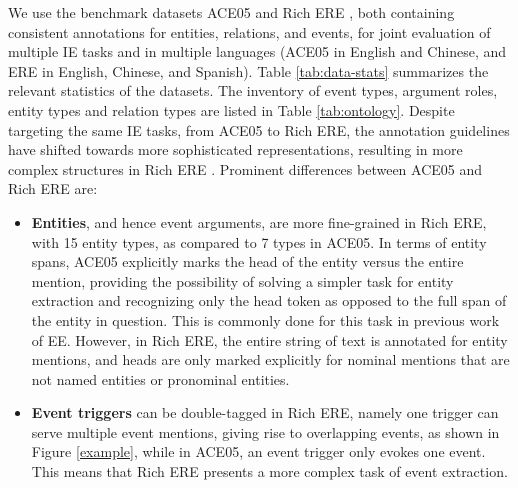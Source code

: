 \documentclass[11pt]{article}
\begin{document}
\begin{table}[t]%
\footnotesize
{}
\caption{\footnotesize Inventory of event types, argument roles, entity types and relation types in ACE05 and Rich ERE.}
\label{tab:ontology}
\end{table}


We use the benchmark datasets ACE05 \cite{doddington-etal-2004-automatic} and Rich ERE \cite{song-etal-2015-light}, both containing consistent annotations for entities, relations, and events, for joint evaluation of multiple IE tasks and in multiple languages (ACE05 in English and Chinese, and ERE in English, Chinese, and Spanish). Table \ref{tab:data-stats} summarizes the relevant statistics of the  datasets. The inventory of event types, argument roles, entity types and relation types are listed in Table \ref{tab:ontology}. Despite targeting the same IE tasks, from ACE05 to Rich ERE, the annotation guidelines have shifted towards more sophisticated representations, resulting in more complex structures in Rich ERE \cite{song-etal-2015-light}. Prominent differences between ACE05 and Rich ERE are:

\begin{itemize}[noitemsep]
    \item \textbf{Entities}, and hence event arguments, are more fine-grained in Rich ERE, with 15 entity types, as compared to 7 types in ACE05. In terms of entity spans, ACE05 explicitly marks the head of the entity versus the entire mention, providing the possibility of solving a simpler task for entity extraction and recognizing only the head token as opposed to the full span of the entity in question. This is commonly done for this task in previous work of EE. However, in Rich ERE, the entire string of text is annotated for entity mentions, and heads are only marked explicitly for nominal mentions that are not named entities or pronominal entities. %
    \item \textbf{Event triggers} can be double-tagged in Rich ERE, namely one trigger can serve multiple event mentions, giving rise to overlapping events, as shown in Figure \ref{example}, while in ACE05, an event trigger only evokes one event. This means that Rich ERE presents a more complex task of event extraction.
\end{itemize}
\end{document}
